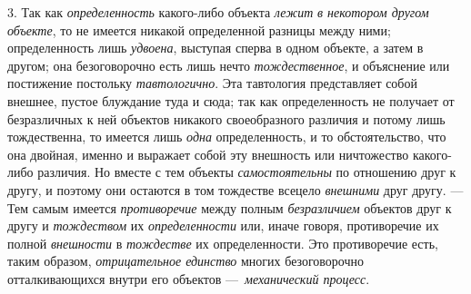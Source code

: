 \documentclass[twoside]{article}
\begin{document}
{{{{{{3. Так как
{\em определенность}
какого-либо объекта
{\em лежит}
{\em в некотором другом объекте},
то не имеется никакой определенной разницы между ними;
определенность лишь {\em удвоена},
выступая сперва в одном объекте, а затем в другом; она
безоговорочно есть лишь нечто
{\em тождественное}, и
объяснение или постижение постольку
{\em тавтологично}. Эта
тавтология представляет собой внешнее, пустое блуждание туда и сюда; так
как определенность не получает от безразличных к ней объектов никакого
своеобразного различия и потому лишь тождественна, то имеется лишь
{\em одна}
определенность, и то обстоятельство, что она двойная, именно
и выражает собой эту внешность или ничтожество какого-либо различия. Но
вместе с тем объекты
{\em самостоятельны} по
отношению друг к другу, и поэтому они остаются в том тождестве всецело
{\em внешними} друг
другу. — Тем самым имеется
{\em противоречие} между
полным {\em безразличием}
объектов друг к другу и
{\em тождеством} их
{\em определенности} или,
иначе говоря, противоречие их полной
{\em внешности} в
{\em тождестве} их
определенности. Это противоречие есть, таким образом,
{\em отрицательное единство}
многих безоговорочно отталкивающихся внутри его объектов
—~{\em механический процесс}.

}}}}}}
\end{document}
